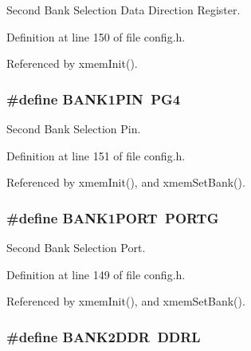 Second Bank Selection Data Direction Register. 



Definition at line 150 of file config.\-h.



Referenced by xmem\-Init().

\hypertarget{group__config_gacfebedc2067e3c52e6ae1f627afcc1e1}{
\subsubsection[{B\-A\-N\-K1\-P\-I\-N}]{\setlength{\rightskip}{0pt plus 5cm}\#define B\-A\-N\-K1\-P\-I\-N~P\-G4}}\label{group__config_gacfebedc2067e3c52e6ae1f627afcc1e1}


Second Bank Selection Pin. 



Definition at line 151 of file config.\-h.



Referenced by xmem\-Init(), and xmem\-Set\-Bank().

\hypertarget{group__config_ga8b3ee7126196f6e939989eae097c3ac4}{
\subsubsection[{B\-A\-N\-K1\-P\-O\-R\-T}]{\setlength{\rightskip}{0pt plus 5cm}\#define B\-A\-N\-K1\-P\-O\-R\-T~P\-O\-R\-T\-G}}\label{group__config_ga8b3ee7126196f6e939989eae097c3ac4}


Second Bank Selection Port. 



Definition at line 149 of file config.\-h.



Referenced by xmem\-Init(), and xmem\-Set\-Bank().

\hypertarget{group__config_ga62f56230c5f5f7220c44ab1c93d677ab}{
\subsubsection[{B\-A\-N\-K2\-D\-D\-R}]{\setlength{\rightskip}{0pt plus 5cm}\#define B\-A\-N\-K2\-D\-D\-R~D\-D\-R\-L}}\label{group__config_ga62f56230c5f5f7220c44ab1c93d677ab}


